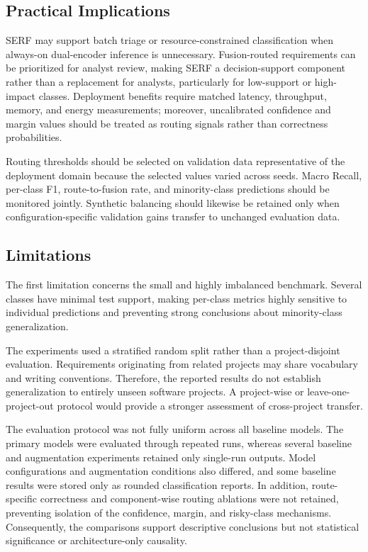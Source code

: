 \documentclass[runningheads]{llncs}
\begin{document}
\subsection{Practical Implications}\label{sec:practical-implications}

SERF may support batch triage or resource-constrained classification when always-on dual-encoder inference is unnecessary. Fusion-routed requirements can be prioritized for analyst review, making SERF a decision-support component rather than a replacement for analysts, particularly for low-support or high-impact classes. Deployment benefits require matched latency, throughput, memory, and energy measurements; moreover, uncalibrated confidence and margin values should be treated as routing signals rather than correctness probabilities.

Routing thresholds should be selected on validation data representative of the deployment domain because the selected values varied across seeds. Macro Recall, per-class F1, route-to-fusion rate, and minority-class predictions should be monitored jointly. Synthetic balancing should likewise be retained only when configuration-specific validation gains transfer to unchanged evaluation data.

\subsection{Limitations}\label{sec:limitations}

The first limitation concerns the small and highly imbalanced benchmark. Several classes have minimal test support, making per-class metrics highly sensitive to individual predictions and preventing strong conclusions about minority-class generalization.

The experiments used a stratified random split rather than a project-disjoint evaluation. Requirements originating from related projects may share vocabulary and writing conventions. Therefore, the reported results do not establish generalization to entirely unseen software projects. A project-wise or leave-one-project-out protocol would provide a stronger assessment of cross-project transfer.

The evaluation protocol was not fully uniform across all baseline models. The primary models were evaluated through repeated runs, whereas several baseline and augmentation experiments retained only single-run outputs. Model configurations and augmentation conditions also differed, and some baseline results were stored only as rounded classification reports. In addition, route-specific correctness and component-wise routing ablations were not retained, preventing isolation of the confidence, margin, and risky-class mechanisms. Consequently, the comparisons support descriptive conclusions but not statistical significance or architecture-only causality.
\end{document}
